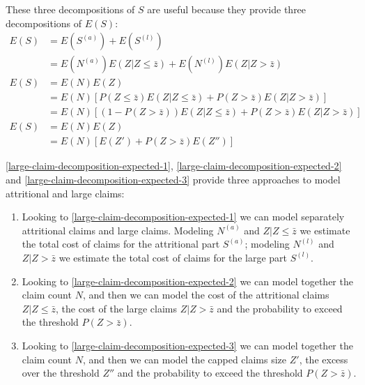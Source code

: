 \documentclass[a4paper, twoside, openright, 12pt]{report}
\providecommand{\tightlist}{%
  \setlength{\itemsep}{0pt}\setlength{\parskip}{0pt}}
\theoremstyle{definition}
\theoremstyle{definition}
\theoremstyle{definition}
\theoremstyle{remark}
\begin{document}
These three decompositions of \(S\) are useful because they provide three decompositions of \(E(S)\):
\begin{align}
  \nonumber
  E(S) & = E(S^{(a)}) + E(S^{(l)}) \\
    \label{large-claim-decomposition-expected-1}
    & = E(N^{(a)}) E(Z|Z\le\bar{z}) + E(N^{(l)}) E(Z|Z>\bar{z}) \\[12pt]
  \nonumber
  E(S) & = E(N) E(Z) \\
    \nonumber
    & = E(N) \left[P(Z\le\bar{z}) E(Z|Z\le\bar{z}) + P(Z>\bar{z}) E(Z|Z > \bar{z}) \right] \\
    \label{large-claim-decomposition-expected-2}
    & = E(N) \left[\left( 1 - P(Z>\bar{z}) \right) E(Z|Z\le\bar{z}) + P(Z>\bar{z}) E(Z|Z > \bar{z})\right] \\[12pt]
  \nonumber
  E(S) & = E(N) E(Z) \\
    \label{large-claim-decomposition-expected-3}
    & = E(N) \left[E(Z') + P(Z>\bar{z}) E(Z'')\right]
\end{align}

\ref{large-claim-decomposition-expected-1}, \ref{large-claim-decomposition-expected-2} and \ref{large-claim-decomposition-expected-3} provide three approaches to model attritional and large claims:

\begin{enumerate}
\def\labelenumi{\arabic{enumi}.}
\tightlist
\item
  Looking to \ref{large-claim-decomposition-expected-1} we can model separately attritional claims and large claims. Modeling \(N^{(a)}\) and \(Z|Z\le\bar{z}\) we estimate the total cost of claims for the attritional part \(S^{(a)}\); modeling \(N^{(l)}\) and \(Z|Z>\bar{z}\) we estimate the total cost of claims for the large part \(S^{(l)}\).
\item
  Looking to \ref{large-claim-decomposition-expected-2} we can model together the claim count \(N\), and then we can model the cost of the attritional claims \(Z|Z\le\bar{z}\), the cost of the large claims \(Z|Z>\bar{z}\) and the probability to exceed the threshold \(P(Z>\bar{z})\).
\item
  Looking to \ref{large-claim-decomposition-expected-3} we can model together the claim count \(N\), and then we can model the capped claims size \(Z'\), the excess over the threshold \(Z''\) and the probability to exceed the threshold \(P(Z>\bar{z})\).
\end{enumerate}
\end{document}
